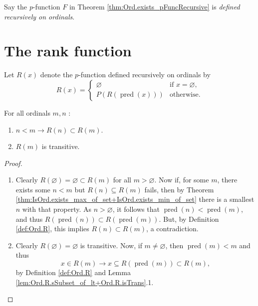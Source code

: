 \begin{definition}
    \label{def:Ord.pFuncRecursive}
    Say the \textit{p}-function $F$ in Theorem \ref{thm:Ord.exists_pFuncRecursive} is
    \textit{defined recursively on ordinals}.
\end{definition}

\section{The rank function}

\begin{definition}
    \label{def:Ord.R}
    Let $R(x)$ denote the $p$-function defined recursively on ordinals by
    $$
    R(x) = \begin{cases}
        \varnothing & \text{if } x = \varnothing, \\
        P(R(\operatorname{pred}(x))) & \text{otherwise}.
    \end{cases}
    $$
\end{definition}

\begin{lemma}
    \label{lem:Ord.R.sSubset_of_lt+Ord.R.isTrans}
    For all ordinals $m,n$ :
    \begin{enumerate}
        \item $n < m \rightarrow R(n) \subset R(m)$.
        \item $R(m)$ is transitive.
    \end{enumerate}
\end{lemma}

\begin{proof}
    \begin{enumerate}
        \item Clearly $R(\varnothing) = \varnothing \subset R(m)$ for all $m>\varnothing$.
        Now if, for some $m$, there exists some $n<m$ but $R(n) \subseteq R(m)$ fails,
        then by Theorem \ref{thm:IsOrd.exists_max_of_set+IsOrd.exists_min_of_set} there is a
        smallest $n$ with that property.
        As $n>\varnothing$, it follows that $\operatorname{pred}(n)<\operatorname{pred}(m)$, and thus 
        $R(\operatorname{pred}(n)) \subset R(\operatorname{pred}(m))$.
        But, by Definition \ref{def:Ord.R}, this implies $R(n) \subset R(m)$, a contradiction.
        
        \item Clearly $R(\varnothing) = \varnothing$ is transitive.
        Now, if $m\neq \varnothing$, then $\operatorname{pred}(m)<m$ and thus 
        $$
        x \in R(m) \rightarrow x \subseteq R(\operatorname{pred}(m)) \subset R(m),
        $$
        by Definition \ref{def:Ord.R} and Lemma \ref{lem:Ord.R.sSubset_of_lt+Ord.R.isTrans}.1.
    \end{enumerate}
\end{proof}

